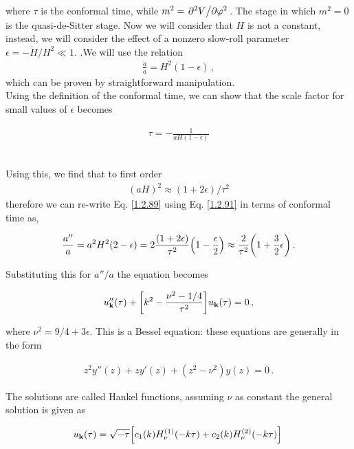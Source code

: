 where \(\tau \) is the conformal time, while \(m^2 = \pdv*[2]{V}{\varphi }\). 
The stage in which \(m^2 = 0\) is the quasi-de-Sitter stage. 
Now we will consider that \(H\) is not a constant, instead, we will consider the effect of a nonzero slow-roll parameter \(\epsilon = - \dot{H} / H^2 \ll 1\). 
.We will use the relation
\begin{align}
    \frac{\ddot{a}}{a} = H^2 ( 1- \epsilon ) \label{1.2.89}
    \,,
\end{align}
which can be proven by straightforward manipulation.\\

Using the definition of the conformal time, we can show that the scale factor for small values of $\epsilon$ becomes

\begin{align}
    \tau = - \frac{1}{a H (1 - \epsilon )}\label{1.2.90}
\end{align}
\
 
Using this, we find that to first order 
\begin{align}
    (aH)^2 \approx (1 + 2 \epsilon ) / \tau^2 \label{1.2.91}
\end{align}
therefore we can re-write Eq. \eqref{1.2.89}  using Eq. \eqref{1.2.91} in terms of conformal time as,

\begin{align}
    \frac{a''}{a} = a^2 H^2 (2- \epsilon ) 
    =2 \frac{(1 + 2 \epsilon)}{\tau^2} \qty(1 - \frac{\epsilon}{2})
    \approx \frac{2}{\tau^2} \qty(1 + \frac{3}{2} \epsilon ) \label{1.2.92}
    \,.
\end{align}

Substituting this for \(a'' /a\) the equation becomes 

\begin{align}
    u''_{\mathbf{k}}(\tau ) + \qty[k^2 - \frac{\nu^2 - 1/4}{\tau^2}]  u_{\mathbf{k}}(\tau )= 0 \,,\label{1.2.93}
\end{align}

where \(\nu^2 = 9/4 + 3 \epsilon \). 
This is a Bessel equation: these equations are generally in the form 

\begin{align}
    z^2 y'' (z) + z y' (z) + (z^2 - \nu^2) y(z) = 0\,.
\end{align}

The solutions are called Hankel functions, assuming \(\nu\) as constant the general solution is given as

\begin{align}
     u_{\mathbf{k}}(\tau ) = \sqrt{- \tau } \qty[ c_1 (k) H_\nu^{(1)} (-k\tau ) + c_2 (k) H_\nu^{(2)} (-k\tau )] \,\label{1.2.95}
\end{align}

